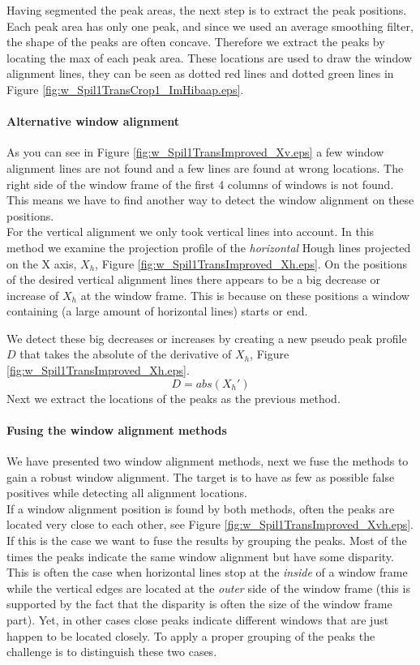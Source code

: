 Having segmented the peak areas, the next step is to extract the peak positions. 
Each peak area has only one peak, and since we used an average smoothing filter, the shape of 
the peaks are often concave. Therefore we extract the peaks by locating the max of each peak area. 
These locations are used to draw the window alignment lines, they can be seen
as dotted red lines and dotted green lines in Figure \ref{fig:w_Spil1TransCrop1_ImHibaap.eps}.

\paragraph{Alternative window alignment}
As you can see in Figure \ref{fig:w_Spil1TransImproved_Xv.eps}
a few window alignment lines are not found and a few lines are found at wrong locations.
The right side of the window frame of the first 4 columns of windows is not found.
This means we have to find another way to detect the window alignment on these positions.\\

For the vertical alignment we only took vertical lines into account.
In this method we examine the projection profile of the \emph{horizontal} Hough lines
projected on the X axis, $X_h$, Figure \ref{fig:w_Spil1TransImproved_Xh.eps}.
On the positions of the desired vertical alignment lines there appears to be a 
big decrease or increase of $X_h$ at the window frame. This is because on these
positions a window containing (a large amount of horizontal lines) starts or end.

We detect these big decreases or increases by creating a new pseudo peak profile
$D$ that takes the absolute of the derivative of $X_h$, Figure \ref{fig:w_Spil1TransImproved_Xh.eps}.
\[D = abs( X_{h}')\]
Next we extract the locations of the peaks as the previous method.

\paragraph{Fusing the window alignment methods}
We have presented two window alignment methods, next we fuse the methods to
gain a robust window alignment.
The target is to have as few as possible false positives while detecting all alignment locations.\\

If a window alignment position is found by both methods, often the peaks are
located very close to each other, see Figure
\ref{fig:w_Spil1TransImproved_Xvh.eps}.  If this is the case we want to fuse the results by grouping the peaks.
Most of the times the peaks indicate the same window alignment but have
some disparity.  This is often the case when horizontal lines stop at the \emph{inside}
of a window frame while the vertical edges are located at the \emph{outer} side of the
window frame (this is supported by the fact that the disparity is often the size of the window frame part).  
Yet, in other cases close peaks indicate different windows that are just happen to be
located closely.  To apply a proper grouping of the peaks the challenge is to
distinguish these two cases.\\

